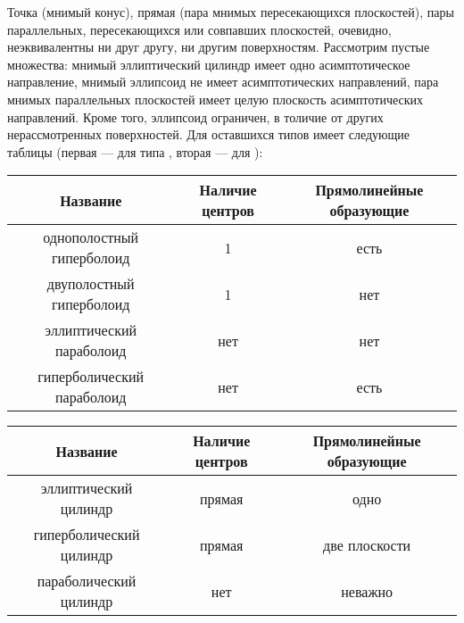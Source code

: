 Точка (мнимый конус), прямая (пара мнимых пересекающихся плоскостей), пары параллельных, пересекающихся или совпавших плоскостей, очевидно, неэквивалентны ни друг другу, ни другим поверхностям. Рассмотрим пустые множества: мнимый эллиптический цилиндр имеет одно асимптотическое направление, мнимый эллипсоид не имеет асимптотических направлений, пара мнимых параллельных плоскостей имеет целую плоскость асимптотических направлений. Кроме того, эллипсоид ограничен, в толичие от других нерассмотренных поверхностей. Для оставшихся типов имеет следующие таблицы (первая --- для типа , вторая --- для ):

\begin{center}
    \begin{tabular}{| c | c | c |}
        \hline
        \textbf{Название} & \textbf{Наличие центров} & \textbf{Прямолинейные образующие}\\
        \hline\hline
        однополостный гиперболоид & 1 & есть\\
        \hline
        двуполостный гиперболоид & 1 & нет\\
        \hline
        эллиптический параболоид & нет & нет\\
        \hline
        гиперболический параболоид & нет & есть\\
        \hline
    \end{tabular}
\end{center}

\begin{center}
    \begin{tabular}{| c | c | c |}
        \hline
        \textbf{Название} & \textbf{Наличие центров} & \textbf{Прямолинейные образующие}\\
        \hline\hline
        эллиптический цилиндр & прямая & одно\\
        \hline
        гиперболический цилиндр & прямая & две плоскости\\
        \hline
        параболический цилиндр & нет & неважно\footnotemark\\
        \hline
    \end{tabular}
\end{center}



